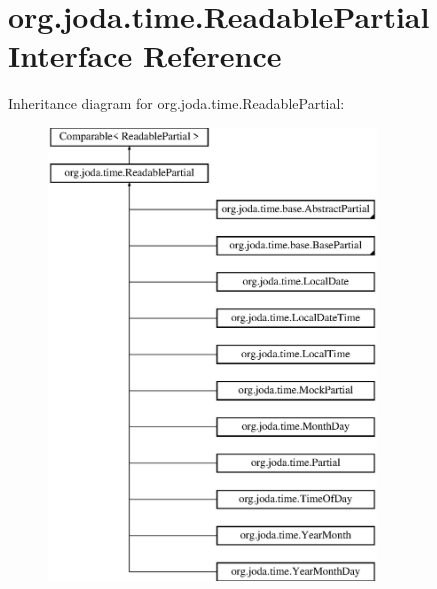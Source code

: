 \hypertarget{interfaceorg_1_1joda_1_1time_1_1_readable_partial}{\section{org.\-joda.\-time.\-Readable\-Partial Interface Reference}
\label{interfaceorg_1_1joda_1_1time_1_1_readable_partial}
}
Inheritance diagram for org.\-joda.\-time.\-Readable\-Partial\-:\begin{figure}[H]
\begin{center}
\leavevmode
\includegraphics[height=12.000000cm]{interfaceorg_1_1joda_1_1time_1_1_readable_partial}
\end{center}
\end{figure}

